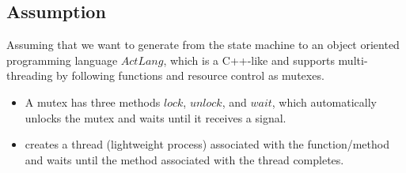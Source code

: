 \subsection{Assumption}
Assuming that we want to generate from the state machine to an object oriented programming language $ActLang$, which is a C++-like and supports multi-threading by following functions and resource control as mutexes.
\begin{itemize}
	
	
	
	
	
	
	\item A mutex has three methods $lock$, $unlock$, and $wait$, which automatically unlocks the mutex and waits until it receives a signal.  
	
	
	
	
	
	\item {} creates a thread (lightweight process) associated with the function/method  and  waits until the method associated with the thread  completes.
\end{itemize} 
